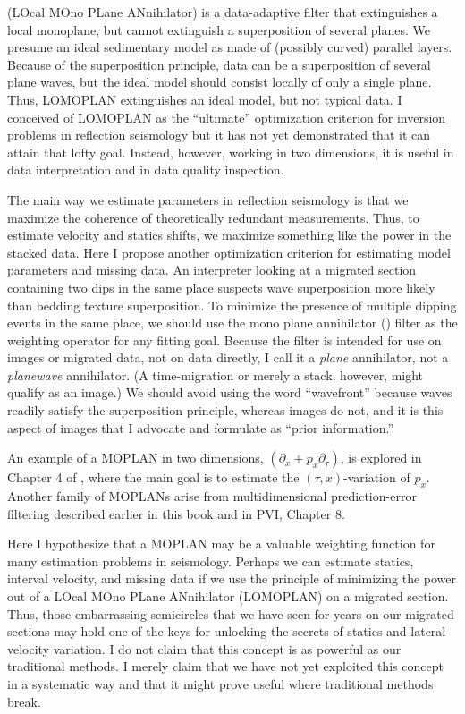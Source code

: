  (LOcal MOno PLane ANnihilator)
is a data-adaptive filter that extinguishes a local monoplane,
but cannot extinguish a superposition of several planes.
We presume an ideal sedimentary model
as made of (possibly curved) parallel layers.
Because of the superposition principle,
data can be a superposition of several plane waves,
but the ideal model should consist locally of only a single plane.
Thus, LOMOPLAN extinguishes an ideal model, but not typical data.
I conceived of LOMOPLAN as the ``ultimate'' optimization criterion
for inversion problems in reflection seismology
but it has not yet demonstrated that it can attain that lofty goal.
Instead,
however, working in two dimensions,
it is useful in data interpretation
and in data quality inspection.

\par
The main way we estimate parameters in reflection seismology
is that we maximize the coherence of theoretically redundant measurements.
Thus, to estimate velocity and statics shifts,
we maximize something like the power in the stacked data.
Here I propose another optimization criterion
for estimating model parameters and missing data.
An interpreter looking at a migrated section containing
two dips in the same place
suspects wave superposition more likely than bedding texture superposition.
To minimize the presence of multiple dipping events in the same place,
we should use the mono plane annihilator () filter
as the weighting operator for any fitting goal.
Because the filter is intended for use on images or migrated data,
not on data directly,
I call it a {\it plane} annihilator, not a {\it planewave} annihilator.
(A time-migration or merely a stack, however, might qualify as an image.)
We should avoid using the word ``wavefront''
because waves readily satisfy the superposition principle,
whereas images do not,
and it is this aspect of images that I advocate and formulate
as ``prior information.''

\par
An example of a MOPLAN in two dimensions,
$(\partial_x + p_x \partial_\tau)$,
is explored in Chapter 4 of 
\cite{Claerbout.blackwell.92},
where the main goal is to estimate the
$(\tau ,x)$-variation of $p_x$.
Another family of MOPLANs arise from multidimensional
prediction-error filtering
described earlier in this book and
in PVI, Chapter 8.

\par
Here I hypothesize that a MOPLAN may be a valuable weighting function
for many estimation problems in seismology.
Perhaps we can estimate statics, interval velocity, and missing data
if we use the principle of minimizing the power out
of a LOcal MOno PLane ANnihilator (LOMOPLAN) on a migrated section.
Thus, those embarrassing semicircles that we have seen for years
on our migrated sections may hold one of the keys
for unlocking the secrets of statics and lateral velocity variation.
I do not claim that this concept is as powerful as our traditional methods.
I merely claim that we have not yet exploited this concept in a systematic way
and that it might prove useful where traditional methods break.

